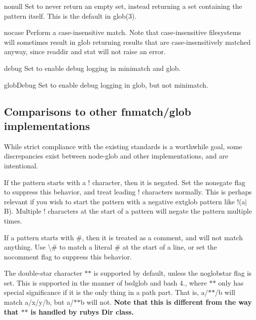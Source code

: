 \begin{DoxyItemize}
\item {\ttfamily nonull} Set to never return an empty set, instead returning a set containing the pattern itself. This is the default in glob(3).
\item {\ttfamily nocase} Perform a case-\/insensitive match. Note that case-\/insensitive filesystems will sometimes result in glob returning results that are case-\/insensitively matched anyway, since readdir and stat will not raise an error.
\item {\ttfamily debug} Set to enable debug logging in minimatch and glob.
\item {\ttfamily glob\+Debug} Set to enable debug logging in glob, but not minimatch.
\end{DoxyItemize}

\subsection*{Comparisons to other fnmatch/glob implementations}

While strict compliance with the existing standards is a worthwhile goal, some discrepancies exist between node-\/glob and other implementations, and are intentional.

If the pattern starts with a {\ttfamily !} character, then it is negated. Set the {\ttfamily nonegate} flag to suppress this behavior, and treat leading {\ttfamily !} characters normally. This is perhaps relevant if you wish to start the pattern with a negative extglob pattern like {\ttfamily !(a$\vert$\+B)}. Multiple {\ttfamily !} characters at the start of a pattern will negate the pattern multiple times.

If a pattern starts with {\ttfamily \#}, then it is treated as a comment, and will not match anything. Use {\ttfamily \textbackslash{}\#} to match a literal {\ttfamily \#} at the start of a line, or set the {\ttfamily nocomment} flag to suppress this behavior.

The double-\/star character {\ttfamily $\ast$$\ast$} is supported by default, unless the {\ttfamily noglobstar} flag is set. This is supported in the manner of bsdglob and bash 4., where {\ttfamily $\ast$$\ast$} only has special significance if it is the only thing in a path part. That is, {\ttfamily a/$\ast$$\ast$/b} will match {\ttfamily a/x/y/b}, but {\ttfamily a/$\ast$$\ast$b} will not. {\bfseries Note that this is different from the way that {\ttfamily $\ast$$\ast$} is handled by ruby\textquotesingle{}s {\ttfamily Dir} class.}

